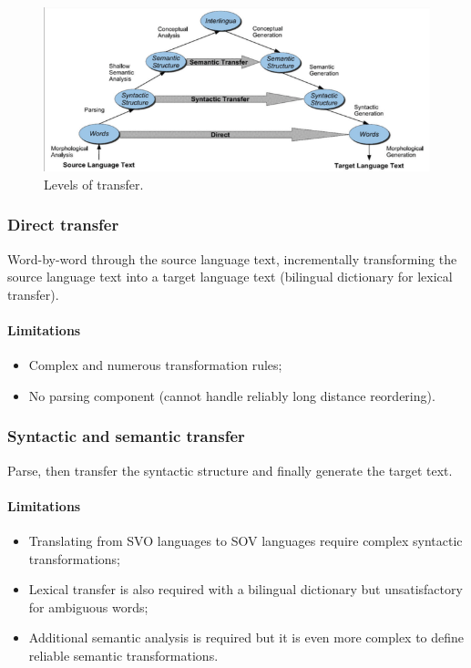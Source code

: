 \begin{figure}[htp]
	\centering
	\includegraphics[scale=0.6]{images/58_levels.png}
 	\caption{Levels of transfer.}
\end{figure}

\subsubsection{Direct transfer}

Word-by-word through the source language text, incrementally transforming the source language text into a target language text (bilingual dictionary for lexical transfer).

\paragraph{Limitations}
\begin{itemize}
	\item Complex and numerous transformation rules;
	\item No parsing component (cannot handle reliably long distance reordering).
\end{itemize}

\subsubsection{Syntactic and semantic transfer}

Parse, then transfer the syntactic structure and finally generate the target text.

\paragraph{Limitations}
\begin{itemize}
	\item Translating from SVO languages to SOV languages require complex syntactic transformations;
	\item Lexical transfer is also required with a bilingual dictionary but unsatisfactory for ambiguous words;
	\item Additional semantic analysis is required but it is even more complex to define reliable semantic transformations.
\end{itemize}

